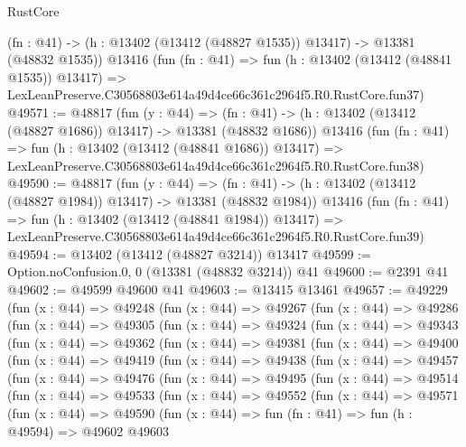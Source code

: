 \begin{lexlean}{RustCore}
\begin{coremodule}
    (fn : @41) -> (h : @13402 (@13412 (@48827 @1535)) @13417) -> @13381 (@48832 @1535))
    @13416
    (fun (fn : @41) =>
    fun (h : @13402 (@13412 (@48841 @1535)) @13417) =>
    LexLeanPreserve.C30568803e614a49d4ce66c361c2964f5.R0.RustCore.fun37)
@49571 := @48817
    (fun (y : @44) =>
    (fn : @41) -> (h : @13402 (@13412 (@48827 @1686)) @13417) -> @13381 (@48832 @1686))
    @13416
    (fun (fn : @41) =>
    fun (h : @13402 (@13412 (@48841 @1686)) @13417) =>
    LexLeanPreserve.C30568803e614a49d4ce66c361c2964f5.R0.RustCore.fun38)
@49590 := @48817
    (fun (y : @44) =>
    (fn : @41) -> (h : @13402 (@13412 (@48827 @1984)) @13417) -> @13381 (@48832 @1984))
    @13416
    (fun (fn : @41) =>
    fun (h : @13402 (@13412 (@48841 @1984)) @13417) =>
    LexLeanPreserve.C30568803e614a49d4ce66c361c2964f5.R0.RustCore.fun39)
@49594 := @13402 (@13412 (@48827 @3214)) @13417
@49599 := Option.noConfusion.{0, 0} (@13381 (@48832 @3214)) @41
@49600 := @2391 @41
@49602 := @49599 @49600 @41
@49603 := @13415 @13461
@49657 := @49229
    (fun (x : @44) =>
    @49248
      (fun (x : @44) =>
      @49267
        (fun (x : @44) =>
        @49286
          (fun (x : @44) =>
          @49305
            (fun (x : @44) =>
            @49324
              (fun (x : @44) =>
              @49343
                (fun (x : @44) =>
                @49362
                  (fun (x : @44) =>
                  @49381
                    (fun (x : @44) =>
                    @49400
                      (fun (x : @44) =>
                      @49419
                        (fun (x : @44) =>
                        @49438
                          (fun (x : @44) =>
                          @49457
                            (fun (x : @44) =>
                            @49476
                              (fun (x : @44) =>
                              @49495
                                (fun (x : @44) =>
                                @49514
                                  (fun (x : @44) =>
                                  @49533
                                    (fun (x : @44) =>
                                    @49552
                                      (fun (x : @44) =>
                                      @49571
                                        (fun (x : @44) =>
                                        @49590
                                          (fun (x : @44) =>
                                          fun (fn : @41) =>
                                          fun (h : @49594) =>
                                          @49602
                                            @49603

\end{coremodule}
\end{lexlean}
